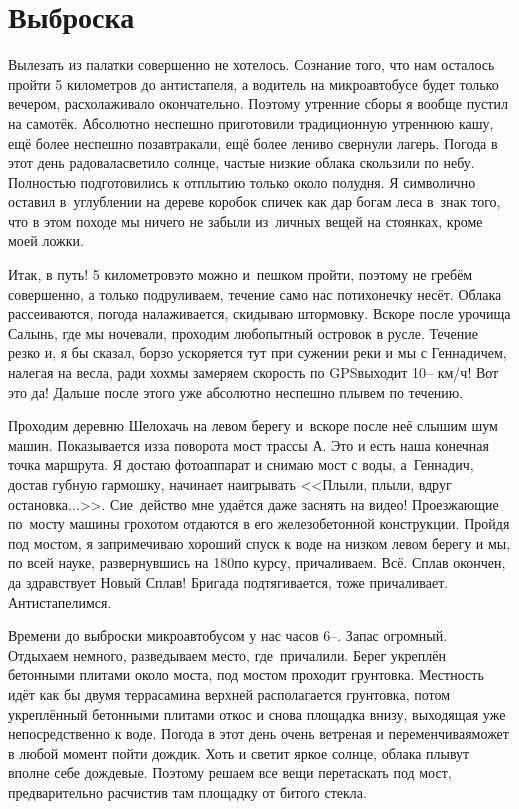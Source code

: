 \chapter{Выброска} 
\vepsianrose

Вылезать из палатки совершенно не хотелось. Сознание того, что нам осталось пройти 5 километров до антистапеля, а водитель на микроавтобусе будет только вечером, расхолаживало окончательно. Поэтому утренние сборы я вообще пустил на самотёк. Абсолютно неспешно приготовили традиционную утреннюю кашу, ещё более неспешно позавтракали, ещё более лениво свернули лагерь. Погода в этот день радовала\mdash светило солнце, частые низкие облака скользили по небу. Полностью подготовились к отплытию только около полудня. Я символично оставил в~углублении на дереве коробок спичек как дар богам леса в~знак того, что в этом походе мы ничего не забыли из~личных вещей на стоянках, кроме моей ложки.

Итак, в путь! 5 километров\mdash это можно и~пешком пройти, поэтому не гребём совершенно, а только подруливаем, течение само нас потихонечку несёт. Облака рассеиваются, погода налаживается, скидываю штормовку. Вскоре после урочища Салынь, где мы ночевали, проходим любопытный островок в русле. Течение резко и, я бы сказал, борзо ускоряется тут при сужении реки и мы с Геннадичем, налегая на весла, ради хохмы замеряем скорость по GPS\mdash выходит 10\thinspace\nobreakdash-- км/ч! Вот это да! Дальше после этого уже абсолютно неспешно плывем по течению. 

Проходим деревню Шелохачь на левом берегу и~вскоре после неё слышим шум машин. Показывается из\sdash за поворота мост трассы А. Это и есть наша конечная точка маршрута. Я достаю фотоаппарат и снимаю мост с воды, а~Геннадич, достав губную гармошку, начинает наигрывать <<Плыли, плыли, вдруг остановка$\ldots$>>. Сие~действо мне удаётся даже заснять на видео! Проезжающие по~мосту машины грохотом отдаются в его железобетонной конструкции. Пройдя под мостом, я запримечиваю хороший спуск к воде на низком левом берегу и мы, по всей науке, развернувшись на 180\degree по курсу, причаливаем. Всё. Сплав окончен, да здравствует Новый Сплав! Бригада подтягивается, тоже причаливает. Антистапелимся.

Времени до выброски микроавтобусом у нас часов 6\thinspace\nobreakdash--. Запас огромный. Отдыхаем немного, разведываем место, где~причалили. Берег укреплён бетонными плитами около моста, под мостом проходит грунтовка. Местность идёт как бы двумя террасами\mdash на верхней располагается грунтовка, потом укреплённый бетонными плитами откос и снова площадка внизу, выходящая уже непосредственно к воде. Погода в этот день очень ветреная  и переменчивая\mdash может в любой момент пойти дождик. Хоть и светит яркое солнце, облака плывут вполне себе дождевые. Поэтому решаем все вещи перетаскать под мост, предварительно расчистив там площадку от битого стекла. 

